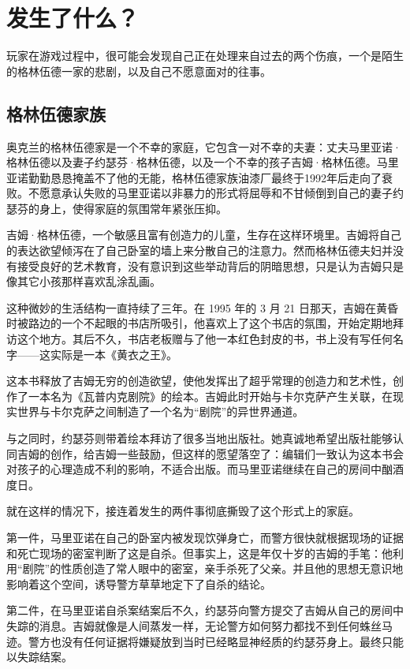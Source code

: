 \section{发生了什么？}

玩家在游戏过程中，很可能会发现自己正在处理来自过去的两个伤痕，一个是陌生的格林伍德一家的悲剧，以及自己不愿意面对的往事。

\subsection{格林伍德家族}

奥克兰的格林伍德家是一个不幸的家庭，它包含一对不幸的夫妻：丈夫马里亚诺·格林伍德以及妻子约瑟芬·格林伍德，以及一个不幸的孩子吉姆·格林伍德。马里亚诺勤勤恳恳掩盖不了他的无能，格林伍德家族油漆厂最终于1992年后走向了衰败。不愿意承认失败的马里亚诺以非暴力的形式将屈辱和不甘倾倒到自己的妻子约瑟芬的身上，使得家庭的氛围常年紧张压抑。

吉姆·格林伍德，一个敏感且富有创造力的儿童，生存在这样环境里。吉姆将自己的表达欲望倾泻在了自己卧室的墙上来分散自己的注意力。然而格林伍德夫妇并没有接受良好的艺术教育，没有意识到这些举动背后的阴暗思想，只是认为吉姆只是像其它小孩那样喜欢乱涂乱画。

这种微妙的生活结构一直持续了三年。在 1995 年的 3 月 21 日那天，吉姆在黄昏时被路边的一个不起眼的书店所吸引，他喜欢上了这个书店的氛围，开始定期地拜访这个地方。其后不久，书店老板赠与了他一本红色封皮的书，书上没有写任何名字——这实际是一本《黄衣之王》。

这本书释放了吉姆无穷的创造欲望，使他发挥出了超乎常理的创造力和艺术性，创作了一本名为《瓦普内克剧院》的绘本。吉姆此时开始与卡尔克萨产生关联，在现实世界与卡尔克萨之间制造了一个名为“剧院”的异世界通道。

与之同时，约瑟芬则带着绘本拜访了很多当地出版社。她真诚地希望出版社能够认同吉姆的创作，给吉姆一些鼓励，但这样的愿望落空了：编辑们一致认为这本书会对孩子的心理造成不利的影响，不适合出版。而马里亚诺继续在自己的房间中酗酒度日。

就在这样的情况下，接连着发生的两件事彻底撕毁了这个形式上的家庭。

第一件，马里亚诺在自己的卧室内被发现饮弹身亡，而警方很快就根据现场的证据和死亡现场的密室判断了这是自杀。但事实上，这是年仅十岁的吉姆的手笔：他利用“剧院”的性质创造了常人眼中的密室，亲手杀死了父亲。并且他的思想无意识地影响着这个空间，诱导警方草草地定下了自杀的结论。

第二件，在马里亚诺自杀案结案后不久，约瑟芬向警方提交了吉姆从自己的房间中失踪的消息。吉姆就像是人间蒸发一样，无论警方如何努力都找不到任何蛛丝马迹。警方也没有任何证据将嫌疑放到当时已经略显神经质的约瑟芬身上。最终只能以失踪结案。

